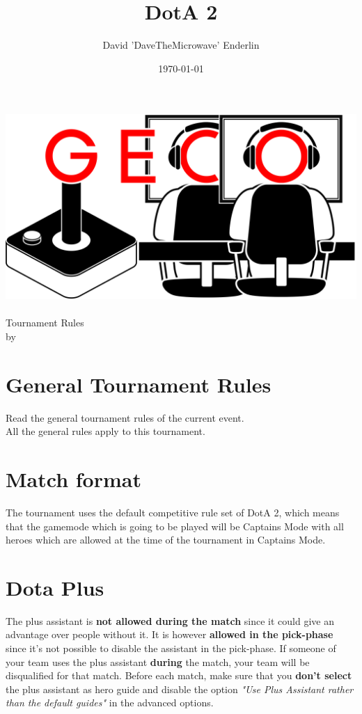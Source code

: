 \documentclass{article}
\title{DotA 2}
\author{David 'DaveTheMicrowave' Enderlin}
\date{\today}
\begin{document}
	
	\makeatletter
	\begin{titlepage}
		\centering
		\includegraphics[scale=0.075]{../img/GECo.png}\\
		\LARGE \@title\\ Tournament Rules\\ \normalsize by \@author\\ \@date
	\end{titlepage}
	\makeatother
	
	\clearpage
	
	\tableofcontents
	\clearpage
	
	\section{General Tournament Rules}
	Read the general tournament rules of the current event.\\
	All the general rules apply to this tournament.
	
	\section{Match format}
	The tournament uses the default competitive rule set of DotA 2, which means that the gamemode which is going to be played will be Captains Mode with all heroes which are allowed at the time of the tournament in Captains Mode.
	
	\section{Dota Plus}
	The plus assistant is \textbf{not allowed during the match} since it could give an advantage over people without it. It is however \textbf{allowed in the pick-phase} since it's not possible to disable the assistant in the pick-phase. If someone of your team uses the plus assistant \textbf{during} the match, your team will be disqualified for that match. Before each match, make sure that you \textbf{don't select} the plus assistant as hero guide and disable the option \textit{"Use Plus Assistant rather than the default guides"} in the advanced options.
	
\end{document}
